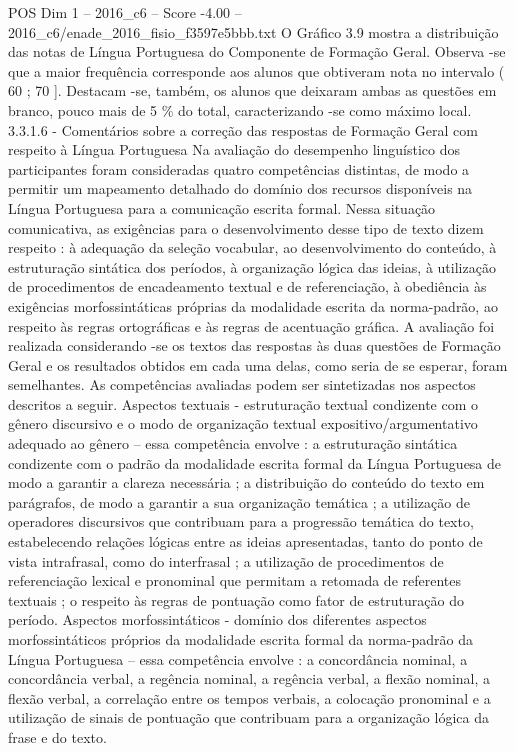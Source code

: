 \begin{textsample}{POS Dim 1 – 2016\_c6 – Score -4.00 – 2016\_c6/enade\_2016\_fisio\_f3597e5bbb.txt}
O Gráfico 3.9 mostra a distribuição das notas de Língua Portuguesa do Componente de Formação Geral.
Observa -se que a maior frequência corresponde aos alunos que obtiveram nota no intervalo ( 60 ; 70 ].
Destacam -se, também, os alunos que deixaram ambas as questões em branco, pouco mais de 5 \% do total, caracterizando -se como máximo local. 3.3.1.6 - Comentários sobre a correção das respostas de Formação Geral com respeito à Língua Portuguesa Na avaliação do desempenho linguístico dos participantes foram consideradas quatro competências distintas, de modo a permitir um mapeamento detalhado do domínio dos recursos disponíveis na Língua Portuguesa para a comunicação escrita formal.
Nessa situação comunicativa, as exigências para o desenvolvimento desse tipo de texto dizem respeito : à adequação da seleção vocabular, ao desenvolvimento do conteúdo, à estruturação sintática dos períodos, à organização lógica das ideias, à utilização de procedimentos de encadeamento textual e de referenciação, à obediência às exigências morfossintáticas próprias da modalidade escrita da norma-padrão, ao respeito às regras ortográficas e às regras de acentuação gráfica.
A avaliação foi realizada considerando -se os textos das respostas às duas questões de Formação Geral e os resultados obtidos em cada uma delas, como seria de se esperar, foram semelhantes.
As competências avaliadas podem ser sintetizadas nos aspectos descritos a seguir.
Aspectos textuais - estruturação textual condizente com o gênero discursivo e o modo de organização textual expositivo/argumentativo adequado ao gênero – essa competência envolve : a estruturação sintática condizente com o padrão da modalidade escrita formal da Língua Portuguesa de modo a garantir a clareza necessária ; a distribuição do conteúdo do texto em parágrafos, de modo a garantir a sua organização temática ; a utilização de operadores discursivos que contribuam para a progressão temática do texto, estabelecendo relações lógicas entre as ideias apresentadas, tanto do ponto de vista intrafrasal, como do interfrasal ; a utilização de procedimentos de referenciação lexical e pronominal que permitam a retomada de referentes textuais ; o respeito às regras de pontuação como fator de estruturação do período.
Aspectos morfossintáticos - domínio dos diferentes aspectos morfossintáticos próprios da modalidade escrita formal da norma-padrão da Língua Portuguesa – essa competência envolve : a concordância nominal, a concordância verbal, a regência nominal, a regência verbal, a flexão nominal, a flexão verbal, a correlação entre os tempos verbais, a colocação pronominal e a utilização de sinais de pontuação que contribuam para a organização lógica da frase e do texto.

\end{textsample}
